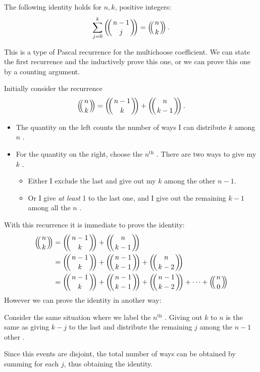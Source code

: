 \documentclass[12pt]{memoir}
\begin{document}
\begin{Lem}
The following identity holds for $n,k$, positive integers:
$$\sum_{j=0}^k\multinom{n-1}{j}=\multinom{n}{k}.$$
\end{Lem}
 This is a type of Pascal recurrence for the multichoose coefficient. We can state the first recurrence and the inductively prove this one, or we can prove this one by a counting argument. 
\begin{ptcb}
    Initially consider the recurrence
    $$\multinom{n}{k}=\multinom{n-1}{k}+\multinom{n}{k-1}.$$
    \begin{itemize}
        \itemsep=-0.4em
        \item The quantity on the left counts the number of ways I can distribute $k$  among $n$ . 
        \item For the quantity on the right, choose the $n^{\text{th}}$ . There are two ways to give my $k$ .
        \vspace*{-0.4em}
        \begin{itemize}
            \itemsep=-0.4em
            \item Either I exclude the last  and give out my $k$  among the other $n-1$.
            \item Or I give \emph{at least} 1  to the last one, and I give out the remaining $k-1$ among all the $n$ .
        \end{itemize} 
    \end{itemize}
\end{ptcb}
With this recurrence it is immediate to prove the identity:
\begin{align*}
    \multinom{n}{k}&=\multinom{n-1}{k}+\multinom{n}{k-1}\\
    &=\multinom{n-1}{k}+\multinom{n-1}{k-1}+\multinom{n}{k-2}\\
    &=\multinom{n-1}{k}+\multinom{n-1}{k-1}+\multinom{n-1}{k-2}+\dots+\multinom{n}{0}
\end{align*}
However we can prove the identity in another way:
\begin{ptcb}
    Consider the same situation where we label the $n^{\text{th}}$ . Giving out $k$  to $n$  is the same as giving $k-j$ to the last  and distribute the remaining $j$  among the $n-1$ other .\par 
    Since this events are disjoint, the total number of ways can be obtained by summing for each $j$, thus obtaining the identity.
\end{ptcb}
\end{document}
